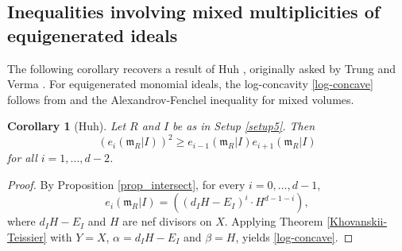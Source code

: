 \documentclass[12pt,a4paper]{amsart}
\theoremstyle{plain}
\newtheorem{corollary}[theorem]{Corollary}
\theoremstyle{definition}
\numberwithin{equation}{theorem}
\begin{document}
\subsection{Inequalities involving mixed multiplicities of equigenerated ideals}

The following corollary recovers a result of Huh \cite[Corollary 22]{Huh12}, originally asked by Trung and Verma \cite[Question 2.7]{TV07}. For equigenerated monomial ideals, the log-concavity \eqref{log-concave} follows from \cite[Theorem 2.4]{TV07} and the Alexandrov-Fenchel inequality for mixed volumes.

\begin{corollary}[Huh]\label{cor_huh}
Let $R$ and $I$ be as in Setup \ref{setup5}. Then
\begin{equation}\label{log-concave}
 {\left(e_i\left(\mathfrak{m}_R \vert I\right)\right)}^2 \geq e_{i-1}\left(\mathfrak{m}_R \vert I\right) e_{i+1}\left(\mathfrak{m}_R \vert I\right)
\end{equation}
for all $i=1,\ldots,d-2$.
\end{corollary}
\begin{proof}
By Proposition \ref{prop_intersect}, for every $i=0,\ldots,d-1$, $$e_i\left(\mathfrak{m}_R \vert I\right) = \left((d_IH-E_I)^{i}\cdot H^{d-1-i}\right),$$ where $d_IH-E_I$ and $H$ are nef divisors on $X$. Applying Theorem \ref{Khovanskii-Teissier} with $Y=X$, $\alpha = d_IH-E_I$ and $\beta = H$, yields \eqref{log-concave}.
\end{proof}
\end{document}
